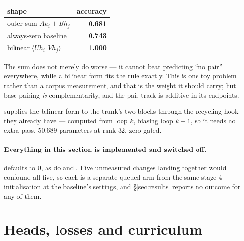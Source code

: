 \documentclass[11pt,a4paper]{article}
\begin{document}
\begin{center}\small
\begin{tabular}{lr}
\toprule
shape & accuracy \\
\midrule
outer sum $A h_i + B h_j$ & \textbf{0.681} \\
always-zero baseline & \textbf{0.743} \\
bilinear $\langle U h_i, V h_j\rangle$ & \textbf{1.000} \\
\bottomrule
\end{tabular}
\end{center}

The sum does not merely do worse --- it cannot beat predicting ``no
pair'' everywhere, while a bilinear form fits the rule exactly. This is
one toy problem rather than a corpus measurement, and that is the weight
it should carry; but base pairing \emph{is} complementarity, and the
pair track is additive in its endpoints.

 supplies the bilinear form to the trunk's two
 blocks through the  recycling hook they
already have --- computed from loop $k$, biasing loop $k{+}1$, so it
needs no extra pass. 50,689 parameters at rank 32, zero-gated.

\paragraph{Everything in this section is implemented and switched off.}
 defaults to $0$, as do 
and . Five unmeasured changes landing together would
confound all five, so each is a separate queued arm from the same
stage-4 initialisation at the baseline's settings, and
\S\ref{sec:results} reports no outcome for any of them.

\section{Heads, losses and curriculum}
\end{document}
